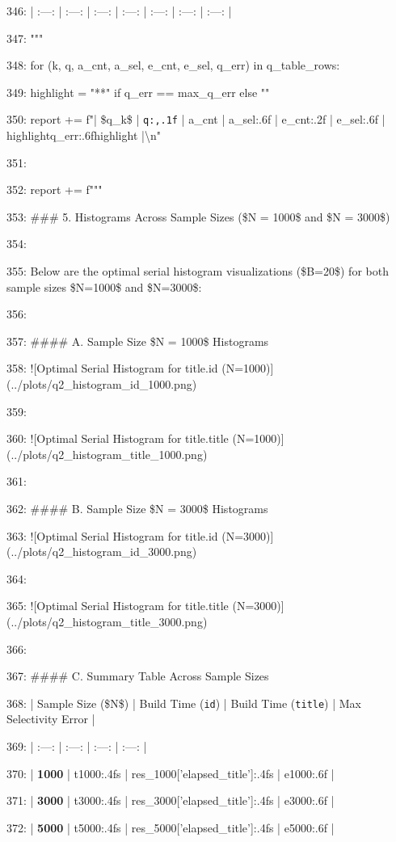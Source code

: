 \documentclass[11pt,a4paper]{article}
\begin{document}
346: | :---: | :---: | :---: | :---: | :---: | :---: | :---: |

347: """

348:     for (k, q, a\_cnt, a\_sel, e\_cnt, e\_sel, q\_err) in q\_table\_rows:

349:         highlight = "**" if q\_err == max\_q\_err else ""

350:         report += f"| \$q\_{k}\$ | \texttt{{q:,.1f}} | {a\_cnt} | {a\_sel:.6f} | {e\_cnt:.2f} | {e\_sel:.6f} | {highlight}{q\_err:.6f}{highlight} |\textbackslash{}n"

351:

352:     report += f"""

353: \#\#\# 5. Histograms Across Sample Sizes (\$N = 1000\$ and \$N = 3000\$)

354:

355: Below are the optimal serial histogram visualizations (\$B=20\$) for both sample sizes \$N=1000\$ and \$N=3000\$:

356:

357: \#\#\#\# A. Sample Size \$N = 1000\$ Histograms

358: ![Optimal Serial Histogram for title.id (N=1000)](../plots/q2\_histogram\_id\_1000.png)

359:

360: ![Optimal Serial Histogram for title.title (N=1000)](../plots/q2\_histogram\_title\_1000.png)

361:

362: \#\#\#\# B. Sample Size \$N = 3000\$ Histograms

363: ![Optimal Serial Histogram for title.id (N=3000)](../plots/q2\_histogram\_id\_3000.png)

364:

365: ![Optimal Serial Histogram for title.title (N=3000)](../plots/q2\_histogram\_title\_3000.png)

366:

367: \#\#\#\# C. Summary Table Across Sample Sizes

368: | Sample Size (\$N\$) | Build Time (\texttt{id}) | Build Time (\texttt{title}) | Max Selectivity Error |

369: | :---: | :---: | :---: | :---: |

370: | \textbf{1000} | {t1000:.4f}s | {res\_1000['elapsed\_title']:.4f}s | {e1000:.6f} |

371: | \textbf{3000} | {t3000:.4f}s | {res\_3000['elapsed\_title']:.4f}s | {e3000:.6f} |

372: | \textbf{5000} | {t5000:.4f}s | {res\_5000['elapsed\_title']:.4f}s | {e5000:.6f} |
\end{document}
